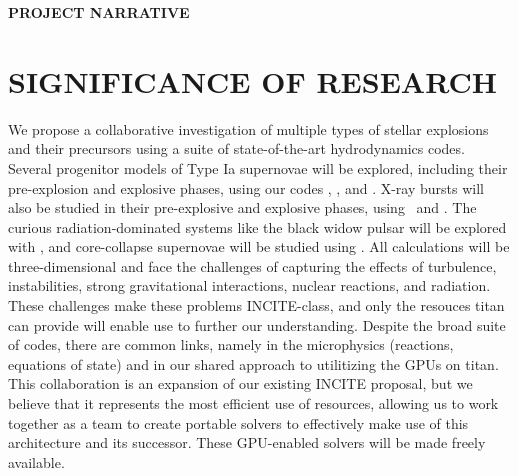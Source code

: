\documentclass[11pt,letterpaper,english]{article}
\begin{document}
\pagestyle{fancy} 
 \renewcommand{%
\headrulewidth}{0.0pt}

\begin{center}
{\bf PROJECT NARRATIVE}
\end{center}


\section{SIGNIFICANCE OF RESEARCH}


We propose a collaborative investigation of multiple types of stellar
explosions and their precursors using a suite of state-of-the-art
hydrodynamics codes.  Several progenitor models of Type Ia supernovae
will be explored, including their pre-explosion and explosive phases,
using our codes \maestro, \castro, and \flash.  X-ray bursts will also
be studied in their pre-explosive and explosive phases, using
\maestro\ and \castro.  The curious radiation-dominated systems like
the black widow pulsar will be explored with \castro, and
core-collapse supernovae will be studied using \chimera.  All
calculations will be three-dimensional and face the challenges of
capturing the effects of turbulence, instabilities, strong
gravitational interactions, nuclear reactions, and radiation.  These
challenges make these problems INCITE-class, and only the resouces
titan can provide will enable use to further our understanding.
Despite the broad suite of codes, there are common links, namely in
the microphysics (reactions, equations of state) and in our shared
approach to utilitizing the GPUs on titan.  This collaboration is an
expansion of our existing INCITE proposal, but we believe that it
represents the most efficient use of resources, allowing us to work
together as a team to create portable solvers to effectively make
use of this architecture and its successor.  These GPU-enabled
solvers will be made freely available.
\end{document}
